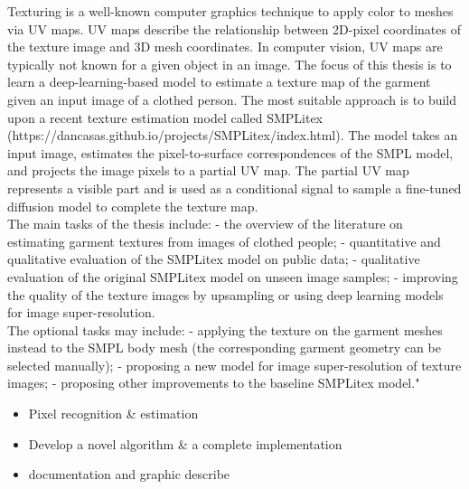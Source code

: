


\begin{task}[] %
	\minisec{\objectivesname}\smallskip	
	Texturing is a well-known computer graphics technique to apply color to meshes via UV maps. UV maps describe the relationship between 2D-pixel coordinates of the texture image and 3D mesh coordinates. In computer vision, UV maps are typically not known for a given object in an image. The focus of this thesis is to learn a deep-learning-based model to estimate a texture map of the garment given an input image of a clothed person. The most suitable approach is to build upon a recent texture estimation model called SMPLitex (https://dancasas.github.io/projects/SMPLitex/index.html). The model takes an input image, estimates the pixel-to-surface correspondences of the SMPL model, and projects the image pixels to a partial UV map. The partial UV map represents a visible part and is used as a conditional signal to sample a fine-tuned diffusion model to complete the texture map.\\ 
 The main tasks of the thesis include:
- the overview of the literature on estimating garment textures from images of clothed people;
- quantitative and qualitative evaluation of the SMPLitex model on public data;
- qualitative evaluation of the original SMPLitex model on unseen image samples;
- improving the quality of the texture images by upsampling or using deep learning models for image super-resolution.\\ 
The optional tasks may include: 
- applying the texture on the garment meshes instead to the SMPL body mesh (the corresponding garment geometry can be selected manually);
- proposing a new model for image super-resolution of texture images;
- proposing other improvements to the baseline SMPLitex model."
	
	\minisec{\focusname}\smallskip
	\begin{itemize}
		\item Pixel recognition \& estimation
		\item Develop a novel algorithm \& a complete implementation
		\item documentation and graphic describe
	\end{itemize}
\end{task}

